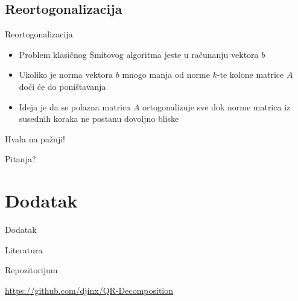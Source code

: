 \documentclass[serbian]{beamer}
\begin{document}
\subsection{Reortogonalizacija}
\begin{frame}{Reortogonalizacija}

\begin{itemize}
	\item Problem klasičnog Šmitovog algoritma jeste u računanju vektora $b$
	\item Ukoliko je norma vektora $b$ mnogo manja od norme $k$-te kolone matrice $A$ doći će do poništavanja
	
	\item Ideja je da se polazna matrica $A$ ortogonalizuje sve dok norme matrica iz susednih koraka ne postanu dovoljno bliske
\end{itemize}

\end{frame}



\begin{frame}

\vspace*{3em}

{\Large Hvala na pa\v znji!} 

\vspace*{1em}

Pitanja?

\end{frame}

\section{Dodatak}

\begin{frame}{Dodatak}

\begin{flushleft}
	{\Large Literatura}
\end{flushleft}

\printbibliography

\begin{flushleft}
	{\Large Repozitorijum}
\end{flushleft}

\href{https://github.com/djinx/QR-Decomposition}{https://github.com/djinx/QR-Decomposition}

\end{frame}
\end{document}
